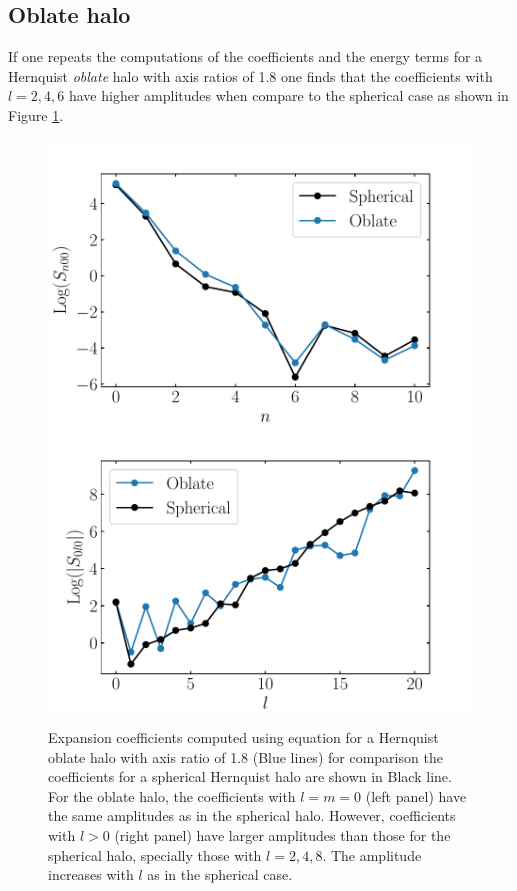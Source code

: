 \documentclass[14pt]{article}
\begin{document}
\subsection{Oblate halo}

If one repeats the computations of the coefficients and the energy terms for a
Hernquist \textit{oblate} halo with axis ratios of 1.8 one finds that the coefficients
with $l=2,4,6$ have higher amplitudes when compare to the spherical case as shown
in Figure \ref{fig:oblate_coeff}. 


\begin{figure}[H]
  \centering
  \includegraphics[scale=0.5]{../code/S_n_henrquist_oblate.pdf}
  \includegraphics[scale=0.5]{../code/S_l_henrquist_oblate.pdf}
  \caption{Expansion coefficients computed using equation \label{eq:coeff} for 
  a Hernquist oblate halo with axis ratio of 1.8 (Blue lines) for comparison the 
    coefficients for a spherical Hernquist halo are shown in Black line. For the
oblate halo, the coefficients with $l=m=0$ (left panel) have the same amplitudes as in the
spherical halo. However, coefficients with $l>0$ (right panel) have larger amplitudes 
than those for the spherical halo, specially those with $l=2,4,8$. The amplitude increases with $l$ as in the spherical case.} \label{fig:oblate_coeff}
\end{figure}
\end{document}
